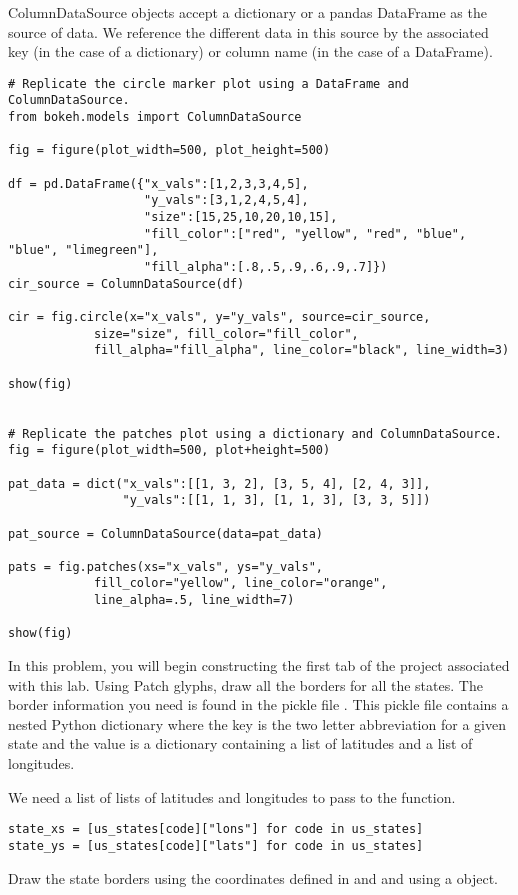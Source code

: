 ColumnDataSource objects accept a dictionary or a pandas DataFrame as the source
of data. We reference the different data in this source by the associated key
(in the case of a dictionary) or column name (in the case of a DataFrame).

\begin{lstlisting}
# Replicate the circle marker plot using a DataFrame and ColumnDataSource.
from bokeh.models import ColumnDataSource

fig = figure(plot_width=500, plot_height=500)

df = pd.DataFrame({"x_vals":[1,2,3,3,4,5],
                   "y_vals":[3,1,2,4,5,4],
                   "size":[15,25,10,20,10,15],
                   "fill_color":["red", "yellow", "red", "blue", "blue", "limegreen"],
                   "fill_alpha":[.8,.5,.9,.6,.9,.7]})
cir_source = ColumnDataSource(df)

cir = fig.circle(x="x_vals", y="y_vals", source=cir_source,
            size="size", fill_color="fill_color",
            fill_alpha="fill_alpha", line_color="black", line_width=3)

show(fig)


# Replicate the patches plot using a dictionary and ColumnDataSource.
fig = figure(plot_width=500, plot+height=500)

pat_data = dict("x_vals":[[1, 3, 2], [3, 5, 4], [2, 4, 3]],
                "y_vals":[[1, 1, 3], [1, 1, 3], [3, 3, 5]])

pat_source = ColumnDataSource(data=pat_data)

pats = fig.patches(xs="x_vals", ys="y_vals",
            fill_color="yellow", line_color="orange",
            line_alpha=.5, line_width=7)

show(fig)

\end{lstlisting}

\begin{problem} \label{prob:borders}
In this problem, you will begin constructing the first tab of the project
associated with this lab. Using Patch glyphs, draw all the borders for all the
states. The border information you need is found in the pickle file
. This pickle file contains a nested Python dictionary
where the key is the two letter abbreviation for a given state and the value is
a dictionary containing a list of latitudes and a list of longitudes.

We need a list of lists of latitudes and longitudes to pass to the
 function.

\begin{lstlisting}
state_xs = [us_states[code]["lons"] for code in us_states]
state_ys = [us_states[code]["lats"] for code in us_states]
\end{lstlisting}

Draw the state borders using the coordinates defined in  and
 and using a  object.
\end{problem}

